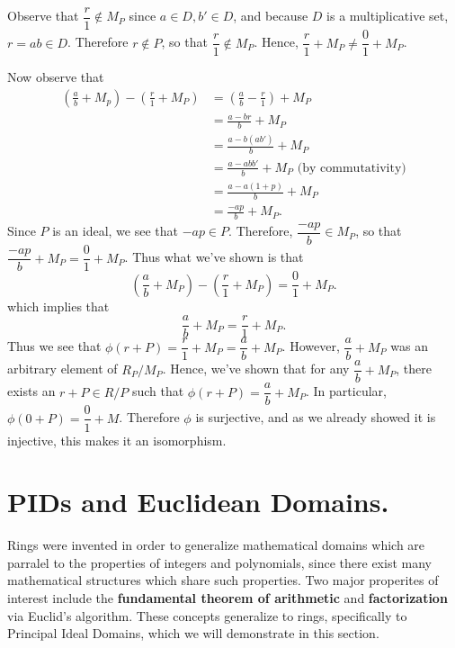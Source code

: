 \begin{prf}
\begin{description}
    Observe that $\dfrac{r}{1} \not\in
    M_P$ since $a \in D, b' \in D$, and because $D$ is a
    multiplicative set, $r = ab \in D$. Therefore $r \not\in P$,
    so that $\dfrac{r}{1} \not\in M_P$. Hence, $\dfrac{r}{1} + M_P
    \ne \dfrac{0}{1} + M_P$. 

    Now observe that 
    \begin{align*}
        \left(\frac{a}{b} + M_p\right) - \left(\frac{r}{1} + M_P\right)
        & = \left( \frac{a}{b} - \frac{r}{1} \right) + M_P\\
        & = \frac{a - br}{b} + M_P\\
        & = \frac{a - b(ab')}{b} + M_P\\
        & = \frac{a - abb'}{b} + M_P \text{ (by commutativity)}\\
        & = \frac{a - a(1 + p)}{b} + M_P\\
        & = \frac{-ap}{b} + M_P.
    \end{align*}
    Since $P$ is an ideal, we see that $-ap \in P$. Therefore,
    $\dfrac{-ap}{b} \in M_P$, so that
    $\dfrac{-ap}{b} + M_P = \dfrac{0}{1} + M_P$. Thus what we've shown is that 
    \[
        \left(\frac{a}{b} + M_P\right) - \left( \frac{r}{1} + M_P \right) = \frac{0}{1} + M_P.
    \]
    which implies that 
    \[
        \frac{a}{b} + M_P = \frac{r}{1} + M_P.
    \]
    Thus we see that $\phi(r + P) = \dfrac{r}{1} + M_P =
    \dfrac{a}{b} + M_P$. However, $\dfrac{a}{b} + M_P$ was an
    arbitrary element of $R_P/M_P$. Hence, we've shown that for
    any $\dfrac{a}{b} + M_P$, there exists an $r + P\in R/P$ such that 
    $\phi(r + P) = \dfrac{a}{b} + M_P$. In particular, $\phi(0 + P) =
    \dfrac{0}{1} + M$. Therefore $\phi$ is surjective,
    and as we already showed it is injective, this makes it an
    isomorphism. 
\end{description}
\end{prf}


\newpage
\section{PIDs and Euclidean Domains.}

Rings were invented in order to generalize mathematical domains which
are parralel to the properties of integers and polynomials, since
there exist many mathematical structures which share such properties.
Two major properites of interest include the \textbf{fundamental
theorem of arithmetic} and \textbf{factorization} via Euclid's
algorithm. These concepts generalize to rings, specifically to
Principal Ideal Domains, which we will demonstrate in this section. 

